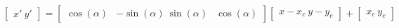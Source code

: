 \documentclass[11pt]{article}
\begin{document}
$\begin{bmatrix} x' \ y' \end{bmatrix} = \begin{bmatrix} \cos(\alpha) & -\sin(\alpha) \ \sin(\alpha) & \cos(\alpha) \end{bmatrix} \begin{bmatrix} x - x_c \ y - y_c \end{bmatrix} + \begin{bmatrix} x_c \ y_c \end{bmatrix}$
\end{document}
